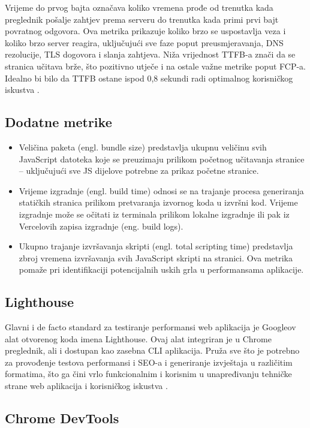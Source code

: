 Vrijeme do prvog bajta označava koliko vremena prođe od trenutka kada preglednik pošalje zahtjev prema serveru do trenutka kada primi prvi bajt povratnog odgovora. Ova metrika prikazuje koliko brzo se uspostavlja veza i koliko brzo server reagira, uključujući sve faze poput preusmjeravanja, DNS rezolucije, TLS dogovora i slanja zahtjeva. Niža vrijednost TTFB-a znači da se stranica učitava brže, što pozitivno utječe i na ostale važne metrike poput FCP-a. Idealno bi bilo da TTFB ostane ispod 0,8 sekundi radi optimalnog korisničkog iskustva \cite{pollardttfb}.

\subsection{Dodatne metrike}

\begin{itemize}
    \item Veličina paketa (engl. bundle size) predstavlja ukupnu veličinu svih JavaScript datoteka koje se preuzimaju prilikom početnog učitavanja stranice – uključujući sve JS dijelove potrebne za prikaz početne stranice.
    \item Vrijeme izgradnje (engl. build time) odnosi se na trajanje procesa generiranja statičkih stranica prilikom pretvaranja izvornog koda u izvršni kod. Vrijeme izgradnje može se očitati iz terminala prilikom lokalne izgradnje ili pak iz Vercelovih zapisa izgradnje (eng. build logs).
    \item Ukupno trajanje izvršavanja skripti (engl. total scripting time) predstavlja zbroj vremena izvršavanja svih JavaScript skripti na stranici. Ova metrika pomaže pri identifikaciji potencijalnih uskih grla u performansama aplikacije.
\end{itemize}


\subsection{Lighthouse}

Glavni i de facto standard za testiranje performansi web aplikacija je Googleov alat otvorenog koda imena Lighthouse. Ovaj alat integriran je u Chrome preglednik, ali i dostupan kao zasebna CLI aplikacija. Pruža sve što je potrebno za provođenje testova performansi i SEO-a i generiranje izvještaja u različitim formatima, što ga čini vrlo funkcionalnim i korisnim u unapređivanju tehničke strane web aplikacija i korisničkog iskustva \cite{googlelighthouse}.

\subsection{Chrome DevTools}

